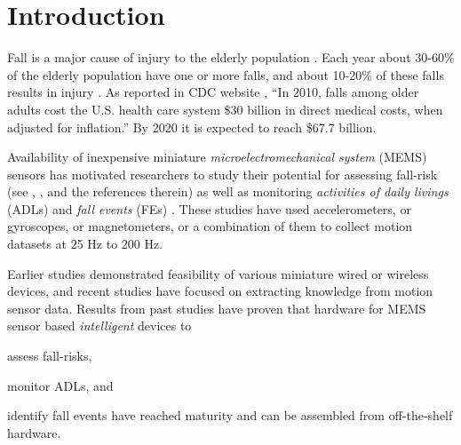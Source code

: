 \documentclass{IEEEtran}
\begin{document}
\section{Introduction}
\label{sec:Intro}
Fall is a major cause of injury to the elderly population \cite{Rubenstein2006}. 
Each year about 30-60\% of the elderly population have one or more falls, and  about 10-20\% of these falls results in injury \cite{Rubenstein2006}. 
As reported in CDC website \cite{CDC2014July},
``In 2010, falls among older adults cost the U.S. health care system \$30 billion in direct medical costs, when adjusted for inflation.'' By 2020 it is expected to reach \$67.7 billion. 
\par 
Availability of inexpensive miniature \emph{microelectromechanical system} (MEMS) sensors  has motivated researchers  to study their potential for assessing fall-risk  (see \cite{shanyReview2012}, \cite{howcroftReview2013}, and the references therein) as well as monitoring \emph{activities of daily livings} (ADLs) \cite{alvarezActivityAndFallRecognotion2015,BaoActivityrecognition2004,DernbachActivityAndFallDetectionPhone2012,krishnanActivityRecognition2014,kumarActivitAndFallDetection2013} and \emph{fall events} (FEs) \cite{baekFallDetection2013,baiFallDetectionPhone2013,DernbachActivityAndFallDetectionPhone2012,dumitracheFallDetection2013,kumarActivitAndFallDetection2013,leoneFallDetection2013,liangFallDetection2012,liFallDetection2009,moyaFallAndDamageDetection2015,ojetolaFallDetection2011,ShenFallDetectionPhone2015,steidlFallDetection2012,DoukasFallDetection2011,ErdoganFallDetection2014,JianFallDetection2015}. These studies have used  accelerometers,  or gyroscopes, or magnetometers, or  a combination of them to collect motion datasets at  25 Hz to 200 Hz.  
\par
Earlier studies demonstrated feasibility of various miniature wired or wireless devices, and recent studies have focused on extracting knowledge from motion sensor data.  Results from past studies have proven  that hardware for MEMS sensor based \emph{intelligent} devices to \begin{inparaenum} [($i$)] \item assess fall-risks, \item monitor ADLs, and \item identify fall events have reached maturity and can be assembled from off-the-shelf hardware. \end{inparaenum}  
\end{document}
